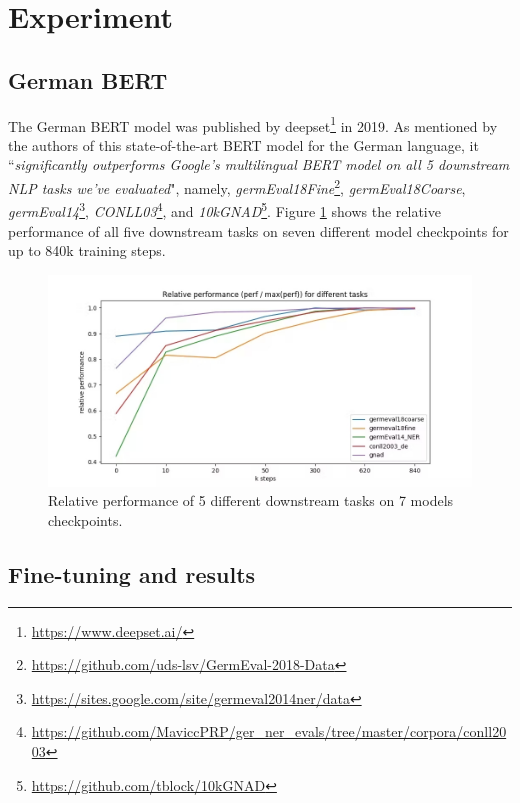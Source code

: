 \documentclass[a4paper,twoside]{article}
\begin{document}
\section{Experiment}

\subsection{German BERT}

The German BERT model was published by deepset\footnote{\url{https://www.deepset.ai/}} in 2019. As mentioned by the authors of this state-of-the-art BERT model for the German language, it ``\textit{significantly outperforms Google's multilingual BERT model on all 5 downstream NLP tasks we've evaluated}", namely, \textit{germEval18Fine}\footnote{\url{https://github.com/uds-lsv/GermEval-2018-Data}}, \textit{germEval18Coarse}, \textit{germEval14}\footnote{\url{https://sites.google.com/site/germeval2014ner/data}}, \textit{CONLL03}\footnote{\url{https://github.com/MaviccPRP/ger_ner_evals/tree/master/corpora/conll2003}}, and \textit{10kGNAD}\footnote{\url{https://github.com/tblock/10kGNAD}}. Figure \ref{fig:rnn_tanh_bm} shows the relative performance of all five downstream tasks on seven different model checkpoints for up to 840k training steps.

\begin{figure}[h]
	\centering
	\includegraphics[width=1.0\linewidth]{latex/gbert.jpeg}
	\caption{Relative performance of 5 different downstream tasks on 7 models checkpoints\cite{gbert}.}
	\label{fig:rnn_tanh_bm}
\end{figure}



\subsection{Fine-tuning and results}
\end{document}
